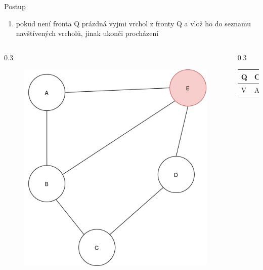 \documentclass[hyperref={unicode}]{beamer}
\begin{document}
\begin{frame}
\begin{block}{Postup}
\begin{enumerate}
  [default]
    \item pokud není fronta Q prázdná vyjmi vrchol z fronty Q a vlož ho do seznamu navštívených vrcholů, jinak ukonči procházení
\end{enumerate}
\end{block}
  \begin{columns}[T]
    \begin{column}{0.3\linewidth}
        \begin{figure}
        \includegraphics[width=\linewidth]{state5.png}
        \end{figure}
    \end{column}
    \begin{column}{0.3\linewidth}
    \begin{table}[]
        \begin{tabular}{|l||l|l|l|}
        \hline
        Q & C &  &  \\ \hline
        V & A & B & E  \\ \hline
        \end{tabular}
\end{table}
    \end{column}
  \end{columns}
\end{frame}
\end{document}
